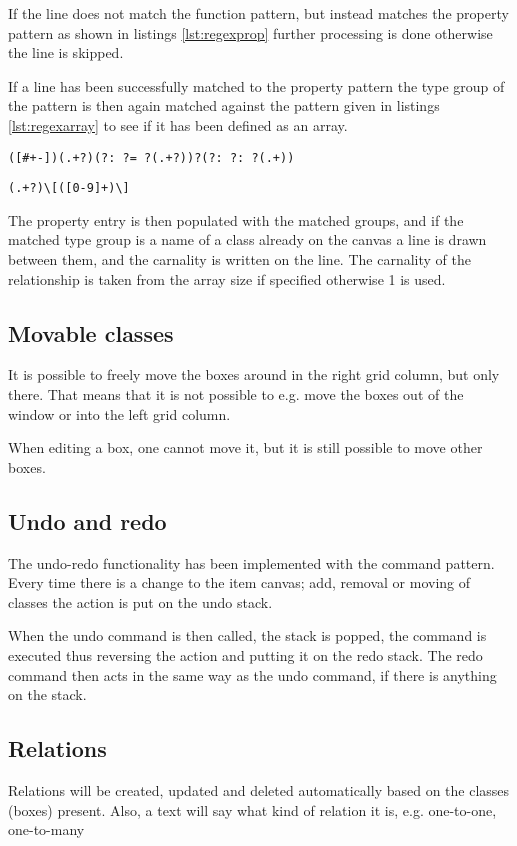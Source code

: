 If the line does not match the function pattern, but instead matches the property pattern as shown in listings \ref{lst:regexprop} further processing is done otherwise the line is skipped.

If a line has been successfully matched to the property pattern the type group of the pattern is then again matched against the pattern given in listings \ref{lst:regexarray} to see if it has been defined as an array.

\begin{lstlisting}[caption={RegEx for property matching},label=lst:regexprop]
([#+-])(.+?)(?: ?= ?(.+?))?(?: ?: ?(.+))
\end{lstlisting}

\begin{lstlisting}[caption={RegEx for array matching},label=lst:regexarray]
(.+?)\[([0-9]+)\]
\end{lstlisting}

The property entry is then populated with the matched groups, and if the matched type group is a name of a class already on the canvas a line is drawn between them, and the carnality is written on the line.
The carnality of the relationship is taken from the array size if specified otherwise 1 is used.

\subsection{Movable classes}
It is possible to freely move the boxes around in the right grid column, but only there. That means that it is not possible to e.g. move the boxes out of the window or into the left grid column.

When editing a box, one cannot move it, but it is still possible to move other boxes.

\subsection{Undo and redo}
The undo-redo functionality has been implemented with the command pattern.
Every time there is a change to the item canvas; add, removal or moving of classes the action is put on the undo stack.

When the undo command is then called, the stack is popped, the command is executed thus reversing the action and putting it on the redo stack. The redo command then acts in the same way as the undo command, if there is anything on the stack.

\subsection{Relations}
Relations will be created, updated and deleted automatically based on the classes (boxes) present. Also, a text will say what kind of relation it is, e.g. one-to-one, one-to-many

